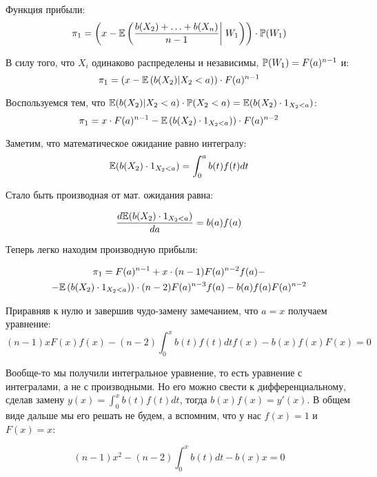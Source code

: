 \begin{enumerate}
Функция прибыли:
\begin{equation}
\pi_{1}=\left(x-\E\left(\frac{b(X_{2})+\ldots+b(X_{n})}{n-1} \right|\left.\vphantom{\frac{b(X_{2})+\ldots+b(X_{n})}{n-1}} W_{1}\right)\right)\cdot \P(W_{1})
\end{equation}

В силу того, что $ X_{i} $ одинаково распределены и независимы, $ \P(W_{1})=F(a)^{n-1} $ и:
\begin{equation}
\pi_{1}=(x-\E\left(b(X_{2})|X_{2}<a)\right)\cdot F(a)^{n-1}
\end{equation}

Воспользуемся тем, что $ \E(b(X_{2})|X_{2}<a)\cdot \P(X_{2}<a)=\E(b(X_{2})\cdot 1_{X_{2}<a}) $:
\begin{equation}
\pi_{1}=x\cdot F(a)^{n-1}-\E\left(b(X_{2})\cdot 1_{X_{2}<a})\right)\cdot F(a)^{n-2}
\end{equation}

Заметим, что математическое ожидание равно интегралу:
\begin{equation}
\E(b(X_{2})\cdot 1_{X_{2}<a})=\int_{0}^{a}b(t)f(t)dt
\end{equation}

Стало быть производная от мат. ожидания равна:

\begin{equation}
\frac{d \E(b(X_{2})\cdot 1_{X_{2}<a})}{d a}=b(a)f(a)
\end{equation}

Теперь легко находим производную прибыли:

\begin{multline}
\pi_{1}=F(a)^{n-1}+x\cdot (n-1) F(a)^{n-2}f(a)-\\
-\E\left(b(X_{2})\cdot 1_{X_{2}<a})\right)\cdot (n-2)F(a)^{n-3}f(a)-b(a)f(a)F(a)^{n-2}
\end{multline}

Приравняв к нулю и завершив чудо-замену замечанием, что $ a=x $ получаем уравнение:
\begin{equation}
(n-1)xF(x)f(x)-(n-2)\int_{0}^{x}b(t)f(t)dt f(x)-b(x)f(x)F(x)=0
\end{equation}

Вообще-то мы получили интегральное уравнение, то есть уравнение с интегралами, а не с производными. Но его можно свести к дифференциальному, сделав замену $ y(x)=\int_{0}^{x}b(t)f(t)dt $, тогда $ b(x)f(x)=y'(x) $. В общем виде дальше мы его решать не будем, а вспомним, что у нас $ f(x)=1 $ и $ F(x)=x $:

\begin{equation}
(n-1)x^{2}-(n-2)\int_{0}^{x}b(t)dt -b(x)x=0
\end{equation}


\end{enumerate}
